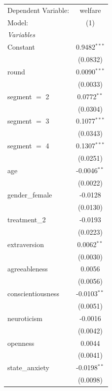 
\begingroup
\centering
\scriptsize
\begin{tabular}{lc}
   \tabularnewline \midrule \midrule
   Dependent Variable: & welfare\\  
   Model:              & (1)\\  
   \midrule
   \emph{Variables}\\
   Constant            & 0.9482$^{***}$\\   
                       & (0.0832)\\   
   round               & 0.0090$^{***}$\\   
                       & (0.0033)\\   
   segment $=$ 2       & 0.0772$^{**}$\\   
                       & (0.0304)\\   
   segment $=$ 3       & 0.1077$^{***}$\\   
                       & (0.0343)\\   
   segment $=$ 4       & 0.1307$^{***}$\\   
                       & (0.0251)\\   
   age                 & -0.0046$^{**}$\\   
                       & (0.0022)\\   
   gender\_female      & -0.0128\\   
                       & (0.0130)\\   
   treatment\_2        & -0.0193\\   
                       & (0.0223)\\   
   extraversion        & 0.0062$^{**}$\\   
                       & (0.0030)\\   
   agreeableness       & 0.0056\\   
                       & (0.0056)\\   
   conscientiousness   & -0.0103$^{**}$\\   
                       & (0.0051)\\   
   neuroticism         & -0.0016\\   
                       & (0.0042)\\   
   openness            & 0.0044\\   
                       & (0.0041)\\   
   state\_anxiety      & -0.0198$^{**}$\\   
                       & (0.0098)\\   

\end{tabular}
